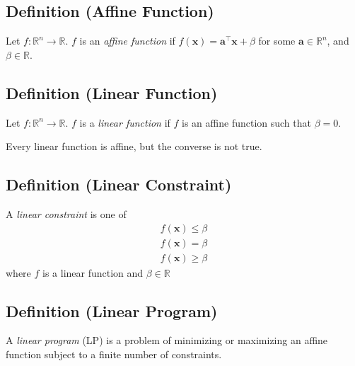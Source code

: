 \begin{defbox}
    \subsection{Definition (Affine Function)}
    Let $f:\mathbb{R}^n\rightarrow\mathbb{R}$. $f$ is an \emph{affine function} if
    $f(\bm{x})=\bm{a}^\top \bm{x}+\beta$ for some $\bm{a}\in\mathbb{R}^n$, and $\beta\in\mathbb{R}$.    
\end{defbox}

\begin{defbox}
    \subsection{Definition (Linear Function)}
    Let $f:\mathbb{R}^n\rightarrow\mathbb{R}$. $f$ is a \emph{linear function} if
    $f$ is an affine function such that $\beta=0$.
\end{defbox}

\begin{remark}
    Every linear function is affine, but the converse is not true.
\end{remark}

\begin{defbox}
    \subsection{Definition (Linear Constraint)}
    A \emph{linear constraint} is one of
    \begin{align*}
        f(\bm{x})\le \beta\\
        f(\bm{x})=\beta\\
        f(\bm{x})\ge \beta
    \end{align*}
    where $f$ is a linear function and $ \beta\in\mathbb{R} $
\end{defbox}

\begin{defbox}
    \subsection{Definition (Linear Program)}
    A \emph{linear program} (LP) is a problem of minimizing or
    maximizing an affine function subject to a finite number
    of constraints.
\end{defbox}